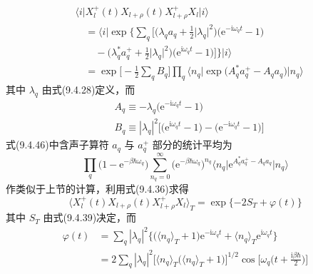 \begin{equation}
\begin{aligned}
  &\bigl\langle i\bigl|X_{l}^{+}(t)X_{l+\rho}(t)X_{l+\rho}^{+}X_{l}
  \bigr|i\bigr\rangle\\
  &\quad=\bigl\langle i\bigl|\exp\biggl\{\sum_{q}\biggl[
  \biggl(\lambda_{q}a_{q}+\frac{1}{2}\bigl|\lambda_{q}\bigr|^{2}\biggr)
  \bigl(\mathrm{e}^{-\mathrm{i}\omega_{q}t}-1\bigr)\\
  &\qquad-\biggl(\lambda_{q}^{*}a_{q}^{+}
  +\frac{1}{2}\bigl|\lambda_{q}\bigr|^{2}\biggr)
  \bigl(\mathrm{e}^{\mathrm{i}\omega_{q}t}-1\bigr)\biggr]\biggr\}
  \biggr|i\bigr\rangle\\
  &\quad=\exp\biggl[-\frac{1}{2}\sum_{q}B_{q}\biggr]\prod_{q}
  \bigl\langle n_{q}\bigl|\exp\bigl(A_{q}^{*}a_{q}^{+}-A_{q}a_{q}\bigr)
  \bigr|n_{q}\bigr\rangle
\end{aligned}
\end{equation}
其中 $\lambda_{q}$ 由式(9.4.28)定义，而
\begin{equation*}
\begin{aligned}
  &A_{q}\equiv-\lambda_{q}\bigl(\mathrm{e}^{-\mathrm{i}\omega_{q}t}-1\bigr)\\
  &B_{q}\equiv|\lambda_{q}|^{2}
  \bigl[\bigl(\mathrm{e}^{\mathrm{i}\omega_{q}t}-1\bigr)
  -\bigl(\mathrm{e}^{-\mathrm{i}\omega_{q}t}-1\bigr)\bigr]
\end{aligned}
\end{equation*}
式(9.4.46)中含声子算符 $a_{q}$ 与 $a_{q}^{+}$ 部分的统计平均为
\begin{equation*}
  \prod_{q}\bigl(1-\mathrm{e}^{-\beta\hbar\omega_{q}}\bigr)
  \sum_{n_{q}=0}^{\infty}\bigl(\mathrm{e}^{-\beta\hbar\omega_{q}}\bigr)^{n_{q}}
  \bigl\langle n_{q}\bigl|\mathrm{e}^{A_{q}^{*}a_{q}^{+}-A_{q}a_{q}}
  \bigr|n_{q}\bigr\rangle
\end{equation*}
作类似于上节的计算，利用式(9.4.36)求得
\begin{equation}
  \bigl\langle X_{l}^{+}(t)X_{l+\rho}(t)X_{l+\rho}^{+}X_{l}
  \bigr\rangle_{T}
  =\exp\{-2S_{T}+\varphi(t)\}
\end{equation}
其中 $S_{T}$ 由式(9.4.39)决定，而
\begin{equation}
\begin{aligned}
  \varphi(t)&=\sum_{q}|\lambda_{q}|^{2}
  \bigl\{\bigl(\langle n_{q}\rangle_{T}+1\bigr)
  \mathrm{e}^{-\mathrm{i}\omega_{q}t}
  +\langle n_{q}\rangle_{T}\mathrm{e}^{\mathrm{i}\omega_{q}t}\bigr\}\\
  &=2\sum_{q}|\lambda_{q}|^{2}
  \bigl[\langle n_{q}\rangle_{T}\bigl(\langle n_{q}\rangle_{T}+1\bigr)
  \bigr]^{1/2}
  \cos\biggl[\omega_{q}\biggl(t+\frac{\mathrm{i}\beta\hbar}{2}\biggr)\biggr]
\end{aligned}
\end{equation}
